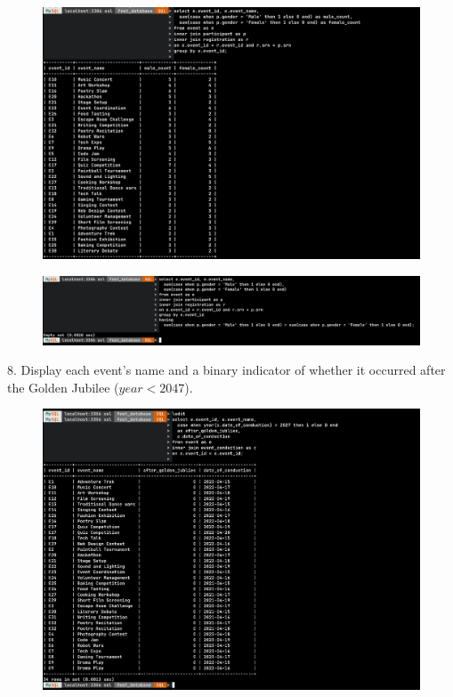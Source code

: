 \documentclass[12pt,a4paper]{article}
\begin{document}
\begin{figure}[H]
    \centering 
    \includegraphics[width=0.9\linewidth]{./images/task2/7a.png}
\end{figure}

\begin{figure}[H]
    \centering 
    \includegraphics[width=0.9\linewidth]{./images/task2/7b.png}
\end{figure}

8. Display each event's name and a binary indicator of whether it occurred after the Golden Jubilee ($\mathit{year} < 2047$).

\begin{figure}[H]
    \centering 
    \includegraphics[width=0.9\linewidth]{./images/task2/8.png}
\end{figure}
\end{document}
